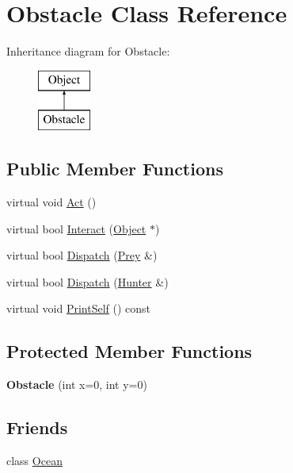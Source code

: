 \hypertarget{classObstacle}{
\section{Obstacle Class Reference}
\label{classObstacle}
}
Inheritance diagram for Obstacle:\begin{figure}[H]
\begin{center}
\leavevmode
\includegraphics[height=2cm]{classObstacle}
\end{center}
\end{figure}
\subsection*{Public Member Functions}
\begin{DoxyCompactItemize}
\item 
virtual void \hyperlink{classObstacle_a4e1f98a918838ca96638e7536e3748cb}{Act} ()
\item 
virtual bool \hyperlink{classObstacle_a53bec243dc8a00f23ec61c915aef4c3e}{Interact} (\hyperlink{classObject}{Object} $\ast$)
\item 
virtual bool \hyperlink{classObstacle_a68eae0dce57aa9f5c044d4223211bfab}{Dispatch} (\hyperlink{classPrey}{Prey} \&)
\item 
virtual bool \hyperlink{classObstacle_a10634bf63cc9f11493002c7105fc7e93}{Dispatch} (\hyperlink{classHunter}{Hunter} \&)
\item 
virtual void \hyperlink{classObstacle_ad4355e9d1db002f6db2ca15ae5605d05}{PrintSelf} () const 
\end{DoxyCompactItemize}
\subsection*{Protected Member Functions}
\begin{DoxyCompactItemize}
\item 
\hypertarget{classObstacle_a57f504fff99441f6250b98ffce750a8a}{
{\bfseries Obstacle} (int x=0, int y=0)}
\label{classObstacle_a57f504fff99441f6250b98ffce750a8a}

\end{DoxyCompactItemize}
\subsection*{Friends}
\begin{DoxyCompactItemize}
\item 
\hypertarget{classObstacle_afe3874c2dc8ab0fb894a9f3c80bfa1ad}{
class \hyperlink{classObstacle_afe3874c2dc8ab0fb894a9f3c80bfa1ad}{Ocean}}
\label{classObstacle_afe3874c2dc8ab0fb894a9f3c80bfa1ad}

\end{DoxyCompactItemize}


